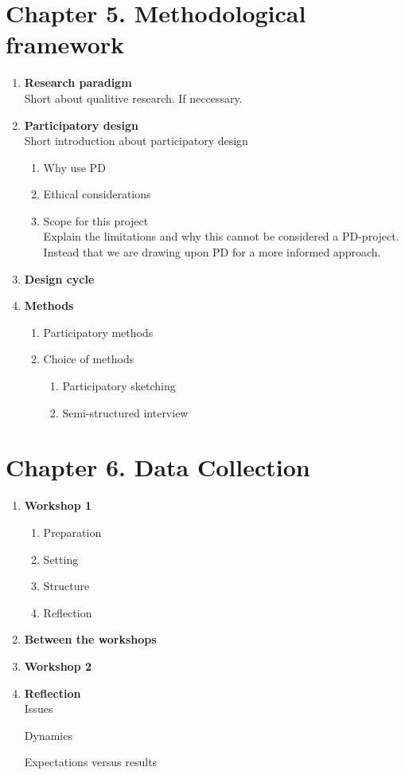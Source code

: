 \documentclass[11pt,UKenglish, a4paper]{article}
\begin{document}
\section{Chapter 5. Methodological framework}
\begin{enumerate}[label=\bfseries\arabic*]
\item \textbf{Research paradigm}\hfill \\
Short about qualitive research. If neccessary.
\item \textbf{Participatory design}\hfill \\
	Short introduction about participatory design
	\begin{enumerate}[label=\bfseries\arabic*]
	\item Why use PD
	\item Ethical considerations
	\item Scope for this project\hfill \\
	Explain the limitations and why this cannot be considered a PD-project. Instead that we are drawing upon PD for a more informed approach.
	\end{enumerate}
	\item \textbf{Design cycle}
	\item \textbf{Methods}
		\begin{enumerate}[label=\bfseries\arabic*]
		\item Participatory methods
		\item Choice of methods
			\begin{enumerate}[label=\bfseries\arabic*]
			\item Participatory sketching
			\item Semi-structured interview
			\end{enumerate}
		\end{enumerate}
\end{enumerate}

\section{Chapter 6. Data Collection}
\begin{enumerate}[label=\bfseries\arabic*]
\item \textbf{Workshop 1}
	\begin{enumerate}[label=\bfseries\arabic*]
	\item Preparation
	\item Setting
	\item Structure
	\item Reflection
	\end{enumerate}
\item \textbf{Between the workshops}
\item \textbf{Workshop 2}
\item \textbf{Reflection} \hfill \\
Issues

Dynamics

Expectations versus results
\end{enumerate}
\end{document}
